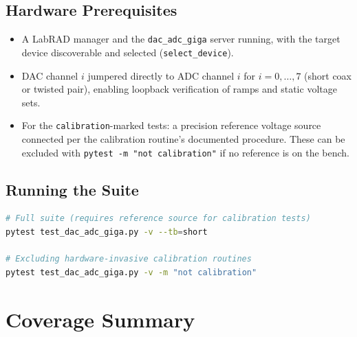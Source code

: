 \documentclass[11pt]{article}
\begin{document}
\subsection{Hardware Prerequisites}

\begin{itemize}[leftmargin=1.4em]
  \item A LabRAD manager and the \texttt{dac\_adc\_giga} server running,
        with the target device discoverable and selected
        (\texttt{select\_device}).
  \item DAC channel $i$ jumpered directly to ADC channel $i$ for
        $i = 0, \ldots, 7$ (short coax or twisted pair), enabling
        loopback verification of ramps and static voltage sets.
  \item For the \texttt{calibration}-marked tests: a precision reference
        voltage source connected per the calibration routine's
        documented procedure. These can be excluded with
        \texttt{pytest -m "not calibration"} if no reference is on the
        bench.
\end{itemize}

\subsection{Running the Suite}

\begin{lstlisting}[language=bash]
# Full suite (requires reference source for calibration tests)
pytest test_dac_adc_giga.py -v --tb=short

# Excluding hardware-invasive calibration routines
pytest test_dac_adc_giga.py -v -m "not calibration"
\end{lstlisting}

\section{Coverage Summary}
\end{document}
